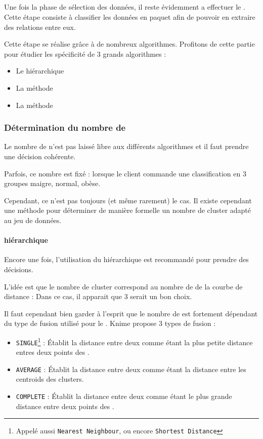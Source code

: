 \subsection{}
Une fois la phase de sélection des données, il reste évidemment a effectuer le . Cette étape consiste à classifier les données en paquet afin de pouvoir en extraire des relations entre eux.

Cette étape se réalise grâce à de nombreux algorithmes. Profitons de cette partie pour étudier les spécificité de 3 grands algorithmes : 
\begin{itemize}
	\item Le  hiérarchique
	\item La méthode 
	\item La méthode 
\end{itemize}

\subsubsection{Détermination du nombre de }
Le nombre de  n'est pas laissé libre aux différents algorithmes et il faut prendre une décision cohérente.

Parfois, ce nombre est fixé : \eg lorsque le client commande une classification en 3 groupes \og maigre\fg, \og normal\fg, \og obèse\fg.

Cependant, ce n'est pas toujours (et même rarement) le cas. Il existe cependant une méthode pour déterminer de manière formelle un nombre de cluster adapté au jeu de données.

\paragraph{ hiérarchique}
Encore une fois, l'utilisation du  hiérarchique est recommandé pour prendre des décisions.

L'idée est que le nombre de cluster correspond au nombre de  de la courbe de distance : 
Dans ce cas, il apparait que 3  serait un bon choix.

Il faut cependant bien garder à l'esprit que le nombre de  est fortement dépendant du type de fusion utilisé pour le . Knime propose 3 types de fusion :
\begin{itemize}
	\item \texttt{SINGLE}\footnote{Appelé aussi \texttt{Nearest Neighbour}, ou encore \texttt{Shortest Distance}} : Établit la distance entre deux  comme étant la plus petite distance entres deux points des .
	\item \texttt{AVERAGE} : Établit la distance entre deux  comme étant la distance entre les centroids des clusters. 
	\item \texttt{COMPLETE} : Établit la distance entre deux  comme étant le plus grande distance entre deux points des .
\end{itemize}

